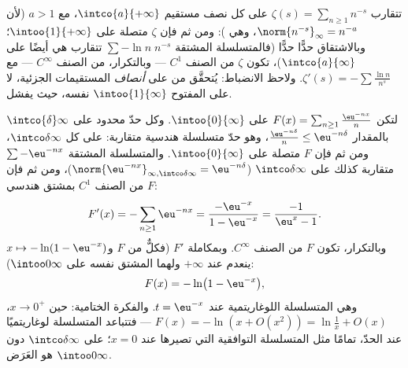 \begin{example}\label{ex:b2:funcseq:zeta}
تتقارب $\zeta(s) = \sum_{n\geq1} n^{-s}$  على كل نصف
مستقيم $\intco{a}{+\infty}$، مع $a > 1$ (لأن $\norm{n^{-s}}_\infty =
n^{-a}$، وهي ): ومن ثم فإن $\zeta$ متصلة على $\intoo{1}{+\infty}$؛
وبالاشتقاق حدًّا حدًّا (فالمتسلسلة المشتقة $\sum -\ln n\; n^{-s}$
تتقارب  هي أيضًا على $\intco{a}{\infty}$)، تكون $\zeta$ من الصنف $C^1$
--- وبالتكرار، من الصنف $C^\infty$ --- مع $\zeta'(s) = -\sum \frac{\ln
n}{n^s}$. ولاحظ الانضباط: يُتحقَّق من  على
\emph{أنصاف} المستقيمات الجزئية، لا على المفتوح $\intoo{1}{\infty}$
نفسه، حيث يفشل.
\end{example}

\begin{example}\label{ex:b2:funcseq:logseries}
لتكن $F(x) = \sum_{n\geq1} \frac{\eu^{-nx}}{n}$ على
$\intoo{0}{\infty}$. وكل حدّ محدود على $\intco{\delta}
\infty$ بالمقدار $\frac{\eu^{-n\delta}}{n} \leq \eu^{-n\delta}$، وهو حدّ
متسلسلة هندسية متقاربة:  على كل
$\intco\delta\infty$، ومن ثم فإن $F$ متصلة على
$\intoo{0}{\infty}$. والمتسلسلة المشتقة $\sum -\eu^{-nx}$
متقاربة  كذلك على $\intco\delta\infty$
($\norm{\eu^{-nx}}_{\infty,\intco\delta\infty} =
\eu^{-n\delta}$)، ومن ثم فإن $F$ من الصنف $C^1$ بمشتق هندسي:
\[
F'(x) = -\sum_{n\geq1}\eu^{-nx}
= \frac{-\eu^{-x}}{1 - \eu^{-x}}
= \frac{-1}{\eu^{x} - 1} .
\]
وبالتكرار، تكون $F$ من الصنف $C^\infty$. وبمكاملة $F'$ (فكلٌّ من $F$ و$x
\mapsto -\ln(1 - \eu^{-x})$ ينعدم عند $+\infty$ ولهما
المشتق نفسه على $\intoo0\infty$):
\[
F(x) = -\ln\bigl(1 - \eu^{-x}\bigr),
\]
وهي المتسلسلة اللوغاريتمية عند $t = \eu^{-x}$. والفكرة الختامية: حين $x
\to 0^+$، $F(x) = -\ln(x + O(x^2)) = \ln\frac1x + O(x)$ --- فتتباعد
المتسلسلة لوغاريتميًا عند الحدّ، تمامًا مثل
المتسلسلة التوافقية التي تصيرها عند $x = 0$؛  على
$\intco\delta\infty$ دون $\intoo0\infty$ هو
العَرَض.
\end{example}

